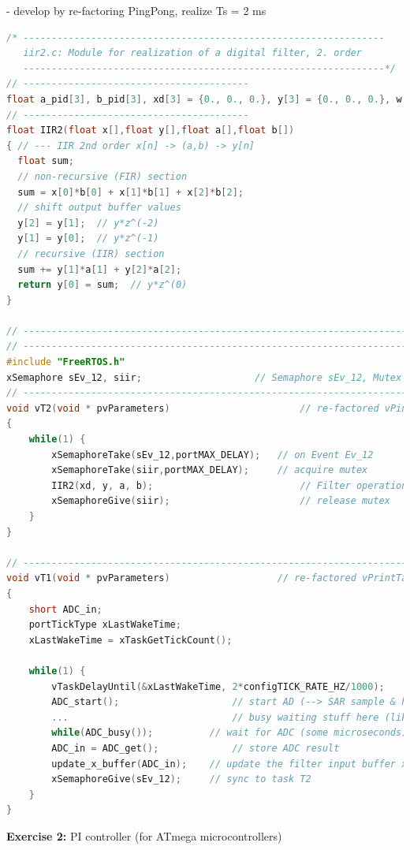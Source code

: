 - develop by re-factoring PingPong, realize Ts = 2 ms

\begin{lstlisting}[style=mystyle, language=c]
/* ----------------------------------------------------------------
   iir2.c: Module for realization of a digital filter, 2. order
   ----------------------------------------------------------------*/
// ----------------------------------------
float a_pid[3], b_pid[3], xd[3] = {0., 0., 0.}, y[3] = {0., 0., 0.}, w = 0.;
// ----------------------------------------
float IIR2(float x[],float y[],float a[],float b[])
{ // --- IIR 2nd order x[n] -> (a,b) -> y[n] 
  float sum;
  // non-recursive (FIR) section
  sum = x[0]*b[0] + x[1]*b[1] + x[2]*b[2];
  // shift output buffer values
  y[2] = y[1];  // y*z^(-2)
  y[1] = y[0];  // y*z^(-1)
  // recursive (IIR) section
  sum += y[1]*a[1] + y[2]*a[2];
  return y[0] = sum;  // y*z^(0)
}

// ----------------------------------------------------------------------------
// ----------------------------------------------------------------------------
#include "FreeRTOS.h"
xSemaphore sEv_12, siir;                   	// Semaphore sEv_12, Mutex siir
// ----------------------------------------------------------------------------
void vT2(void * pvParameters)						// re-factored vPingTask
{	
	while(1) {
		xSemaphoreTake(sEv_12,portMAX_DELAY);	// on Event Ev_12
		xSemaphoreTake(siir,portMAX_DELAY);		// acquire mutex
		IIR2(xd, y, a, b);							// Filter operation
		xSemaphoreGive(siir);						// release mutex
	}
}

// ----------------------------------------------------------------------------
void vT1(void * pvParameters)					// re-factored vPrintTask
{	
	short ADC_in;
	portTickType xLastWakeTime;
	xLastWakeTime = xTaskGetTickCount();

	while(1) {
 		vTaskDelayUntil(&xLastWakeTime, 2*configTICK_RATE_HZ/1000);  	// exact periodic Ts = 2 ms 		
		ADC_start();    				// start AD (--> SAR sample & hold) ...
		...								// busy waiting stuff here (like DAC outputs)
		while(ADC_busy());			// wait for ADC (some microseconds) ...
		ADC_in = ADC_get(); 			// store ADC result				
		update_x_buffer(ADC_in);	// update the filter input buffer xd[]
		xSemaphoreGive(sEv_12);  	// sync to task T2
	}	
}
\end{lstlisting}
\newpage

\textbf{Exercise 2: }PI controller (for ATmega microcontrollers)


